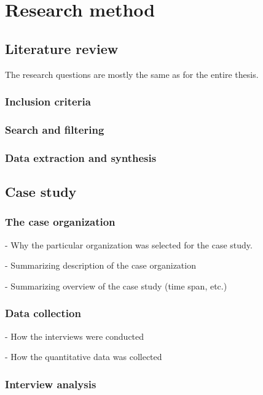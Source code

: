 
\chapter{Research method}
\label{chapter:method}


\section{Literature review}

The research questions are mostly the same as for the entire thesis.

\subsection{Inclusion criteria}

\subsection{Search and filtering}

\subsection{Data extraction and synthesis}



\section{Case study}

\subsection{The case organization}

- Why the particular organization was selected for the case study.

- Summarizing description of the case organization

- Summarizing overview of the case study (time span, etc.)


\subsection{Data collection}

- How the interviews were conducted

- How the quantitative data was collected


\subsection{Interview analysis}

